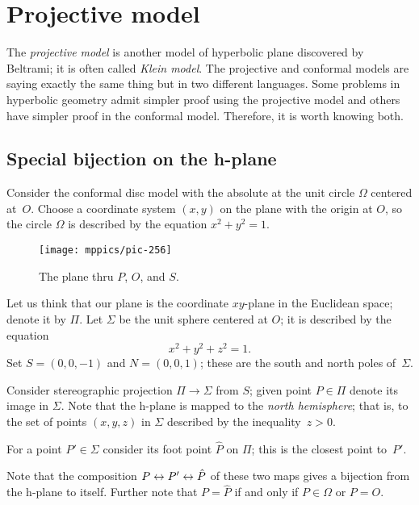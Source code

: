 \chapter{Projective model}\label{chap:klein}

The {}\emph{projective model} is another model of hyperbolic plane discovered by Beltrami; it is often called {}\emph{Klein model}.
The projective and conformal models are saying exactly the same thing but in two different languages. 
Some problems in hyperbolic geometry admit simpler proof using the projective model and others have simpler proof in the conformal model.
Therefore, it is worth knowing both. 

\section*{Special bijection on the h-plane}

Consider the conformal disc model with the absolute at the unit circle $\Omega$ centered at~$O$.
Choose a coordinate system $(x,y)$ on the plane with the origin at $O$, 
so the circle $\Omega$ is described by the equation $x^2+y^2=1$.

{

\label{pic:stereographic_projection-klein}
\begin{wrapfigure}[17]{o}{48mm}
\centering
\texttt{[image: mppics/pic-256]}
\caption*{The plane thru $P$, $O$, and $S$.}
\end{wrapfigure}

Let us think that our plane is the coordinate $xy$-plane in the Euclidean space; denote it by $\Pi$.
Let $\Sigma$ be the unit sphere centered at $O$;
it is described by the equation 
$$x^2+y^2+z^2=1.$$
Set $S=(0,0,-1)$ and $N=(0,0,1)$; 
these are the south and north poles of~$\Sigma$.

Consider stereographic projection $\Pi\to\Sigma$ from $S$;
given point $P\in\Pi$ denote its image in $\Sigma$.
Note that the  h-plane is mapped to the {}\emph{north hemisphere};
that is, to the set of points $(x,y,z)$ in $\Sigma$ described by the inequality~$z>0$.

}

For a point $P'\in \Sigma$ consider its foot point $\hat P$
on $\Pi$;
this is the closest point to~$P'$.

Note that the composition $P\z\leftrightarrow P'\z\leftrightarrow\hat P$ of these two maps
gives a bijection from the h-plane to itself.
Further note that $P=\hat P$
 if and only if  $P\in \Omega$ or $P=O$.

